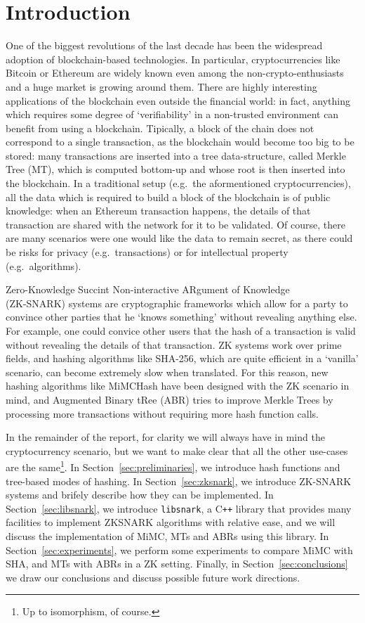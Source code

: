 \section{Introduction}
One of the biggest revolutions of the last decade has been the widespread adoption of
blockchain-based technologies. In particular, cryptocurrencies like Bitcoin or Ethereum are
widely known even among the non-crypto-enthusiasts and a huge market is growing around them.
There are highly interesting applications of the blockchain even outside the financial world:
in fact, anything which requires some degree of `verifiability' in a non-trusted environment can
benefit from using a blockchain.
Tipically, a block of the chain does not correspond to a single transaction, as the blockchain
would become too big to be stored: many transactions are inserted into a tree data-structure,
called Merkle Tree (MT), which is computed bottom-up and whose root is then inserted into the blockchain.
In a traditional setup (e.g.\ the aformentioned cryptocurrencies), all the data which is required
to build a block of the blockchain is of public knowledge: when an Ethereum transaction happens,
the details of that transaction are shared with the network for it to be validated.
Of course, there are many scenarios were one would like the data to remain secret, as there could
be risks for privacy (e.g.\ transactions) or for intellectual property (e.g.\ algorithms).

Zero-Knowledge Succint Non-interactive ARgument of Knowledge\\ (ZK-SNARK) systems are cryptographic
frameworks which allow for a party to convince other parties that he `knows something' without
revealing anything else.
For example, one could convice other users that the hash of a transaction is valid without
revealing the details of that transaction.
ZK systems work over prime fields, and hashing algorithms like SHA-256, which are quite efficient
in a `vanilla' scenario, can become extremely slow when translated.
For this reason, new hashing algorithms like MiMCHash have been designed with the ZK scenario in
mind, and Augmented Binary tRee (ABR) tries to improve Merkle Trees by processing more transactions
without requiring more hash function calls.

In the remainder of the report, for clarity we will always have in mind the cryptocurrency scenario,
but we want to make clear that all the other use-cases are the same\footnote[1]{Up to isomorphism, of
	course.}.
In Section~\ref{sec:preliminaries}, we introduce hash functions and tree-based modes of hashing.
In Section~\ref{sec:zksnark}, we introduce ZK-SNARK systems and brifely describe how they can be
implemented.
In Section~\ref{sec:libsnark}, we introduce \texttt{libsnark}, a C\texttt{++} library that provides
many facilities to implement ZKSNARK algorithms with relative ease, and we will discuss the
implementation of MiMC, MTs and ABRs using this library.
In Section~\ref{sec:experiments}, we perform some experiments to compare MiMC with SHA, and MTs
with ABRs in a ZK setting.
Finally, in Section~\ref{sec:conclusions} we draw our conclusions and discuss possible future work
directions.
